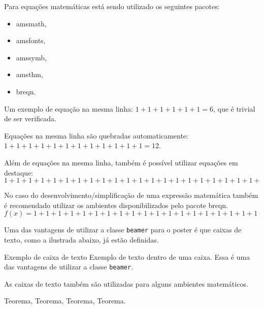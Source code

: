 \documentclass[]{beamer}
\begin{document}
\begin{frame}[t,fragile]
\begin{columns}[t]
\begin{column}{0.4\textwidth}
      Para equações matemáticas está sendo utilizado os seguintes pacotes:
      \begin{itemize}
        \item amsmath,
        \item amsfonts,
        \item amssymb,
        \item amsthm,
        \item breqn.
      \end{itemize}

      Um exemplo de equação na mesma linha:
      $ 1 + 1 + 1 + 1 + 1 + 1 = 6$,
      que é trivial de ser verificada.

      Equações na mesma linha são quebradas automaticamente:
      $ 1 + 1 + 1 + 1 + 1 + 1 + 1 + 1 + 1 + 1 + 1 + 1 = 12$.

      Além de equações na mesma linha, também é possível utilizar equações em
      destaque:
      \begin{dmath}
        1 + 1 + 1 + 1 + 1 + 1 + 1 + 1 + 1 + 1 + 1 + 1 + 1 + 1 + 1 + 1 + 1 + 1 + 1
        + 1 + 1 + 1 + 1 + 1 + 1 + 1 + 1 + 1 + 1 + 1 = 30
      \end{dmath}

      No caso do desenvolvimento/simplificação de uma expressão
      matemática também é recomendado utilizar os ambientes
      disponibilizados pelo pacote breqn.
      \begin{dmath}
        f(x) = 1 + 1 + 1 + 1 + 1 + 1 + 1 + 1 + 1 + 1 + 1 + 1 + 1 + 1 + 1 + 1 + 1 +
        1 + 1 + 1 + 1 + 1 + 1 + 1 + 1 + 1 + 1 + 1 + 1 + 1
        = 2 + 2 + 2 + 2 + 2 + 2 + 2 + 2 + 2 + 2 + 2 + 2 + 2 + 2 + 2
        = 4 + 4 + 4 + 4 + 4 + 4 + 4 + 2
        = 8 + 8 + 8 + 6
        = 16 + 14
        = 30
      \end{dmath}

      Uma das vantagens de utilizar a classe \lstinline+beamer+ para o poster é
      que caixas de texto, como a ilustrada abaixo, já estão definidas.

      \begin{block}{Exemplo de caixa de texto}
        Exemplo de texto dentro de uma caixa. Essa é uma das vantagens de
        utilizar a classe \lstinline+beamer+.
      \end{block}

      As caixas de texto também são utilizadas para alguns ambientes
      matemáticos.

      \begin{thm}
        Teorema, Teorema, Teorema, Teorema.
      \end{thm}


\end{column}
\end{columns}
\end{frame}
\end{document}
